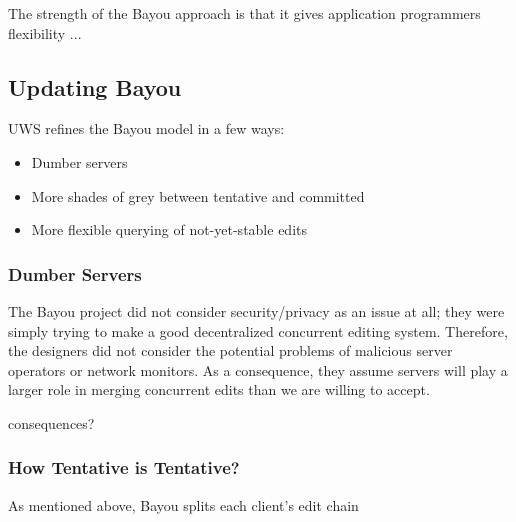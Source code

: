 \documentclass{article}
\begin{document}
The strength of the Bayou approach is that it gives application programmers flexibility ...

\subsection{Updating Bayou}

UWS refines the Bayou model in a few ways:

\begin{itemize}
\item Dumber servers
\item More shades of grey between tentative and committed
\item More flexible querying of not-yet-stable edits
\end{itemize}

\subsubsection{Dumber Servers}

The Bayou project did not consider security/privacy as an issue at all; they were simply trying to make a good decentralized concurrent editing system.
Therefore, the designers did not consider the potential problems of malicious server operators or network monitors.
As a consequence, they assume servers will play a larger role in merging concurrent edits than we are willing to accept.

consequences?

\subsubsection{How Tentative is Tentative?}

As mentioned above, Bayou splits each client's edit chain 
\end{document}
